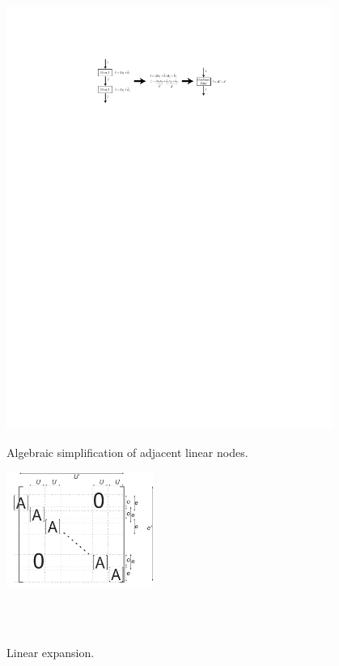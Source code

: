 \documentclass{csailabstractbook}
\begin{document}
\begin{figure}[t]
  \begin{center}
    \begin{minipage}{4.2in}
    \includegraphics[width=4.2in]{thies3-6.pdf} %
    \vspace{-20pt}
    \caption{Algebraic simplification of adjacent linear nodes.\protect\label{fig:thies3-combo}}
    \end{minipage}
    \begin{minipage}{1.9in}
      \vspace{-3pt}
    \includegraphics[width=1.9in]{thies3-1.pdf} %
    \vspace{-20pt}
    \caption{Linear expansion.\protect\label{fig:thies3-expand}}
    \end{minipage}
    \\ ~ \vspace{12pt} \\

\end{center}
\end{figure}
\end{document}
